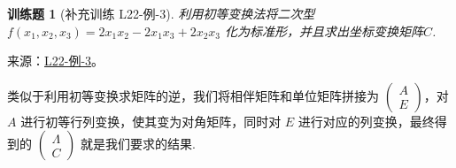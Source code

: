 \documentclass[UTF8,12pt,a4paper,fontset=fandol]{ctexart}
\newtheorem{exercise}{训练题}[section]
\begin{document}
\begin{exercise}[补充训练 L22-例-3]\label{prob:L22-例-3}
利用初等变换法将二次型 $f(x_1,x_2,x_3)=2x_1x_2-2x_1x_3+2x_2x_3$ 化为标准形，并且求出坐标变换矩阵$C$.
\end{exercise}
\noindent 来源：\href{https://github.com/yhwu-is/Linear-Algebra-Left-Undone/blob/new/%E8%AE%B2%E4%B9%89/%E4%B8%93%E9%A2%98/22%20%E4%BA%8C%E6%AC%A1%E5%9E%8B.tex}{L22-例-3}。
\begin{solve}
类似于利用初等变换求矩阵的逆，我们将相伴矩阵和单位矩阵拼接为 $\begin{pmatrix}
        A \\ E
    \end{pmatrix}$，对 $A$ 进行初等行列变换，使其变为对角矩阵，同时对 $E$ 进行对应的列变换，最终得到的 $\begin{pmatrix}
        \Lambda \\ C
    \end{pmatrix}$ 就是我们要求的结果.


\end{solve}
\end{document}
